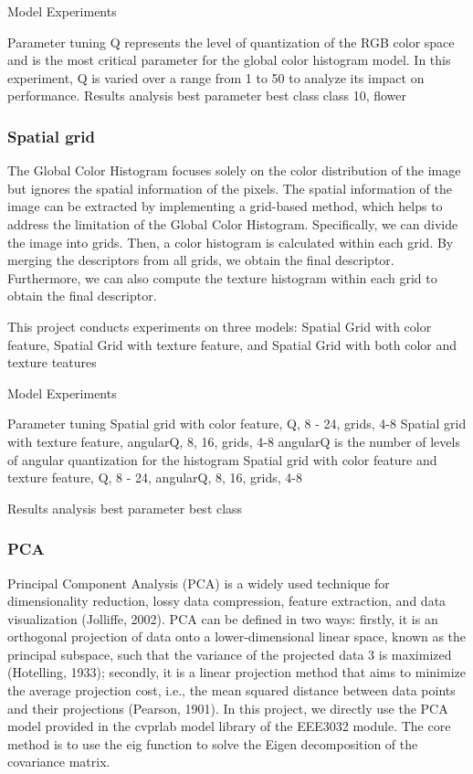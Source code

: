 \documentclass{article}
\begin{document}
Model Experiments

Parameter tuning
Q represents the level of quantization of the RGB color space and is the most critical parameter for the global color histogram model. In this experiment,  Q is varied over a range from 1 to 50 to analyze its impact on performance.
Results analysis
best parameter
best class   class 10, flower

\subsubsection{Spatial grid}

The Global Color Histogram focuses solely on the color distribution of the image but ignores the spatial information of the pixels. The spatial information of the image can be extracted by implementing a grid-based method, which helps to address the limitation of the Global Color Histogram. Specifically, we can divide the image into grids. Then, a color histogram is calculated within each grid. By merging the descriptors from all grids, we obtain the final descriptor. Furthermore, we can also compute the texture histogram within each grid to obtain the final descriptor.

This project conducts experiments on three models: Spatial Grid with color feature, Spatial Grid with texture feature, and Spatial Grid with both color and texture teatures



Model Experiments

Parameter tuning
Spatial grid with color feature,  Q, 8 - 24,  grids, 4-8
Spatial grid with texture feature, angularQ, 8, 16, grids, 4-8     angularQ is  the number of levels of angular quantization for the histogram
Spatial grid with color feature and texture feature,  Q, 8 - 24,  angularQ, 8, 16, grids, 4-8

Results analysis
best parameter
best class

\subsubsection{PCA}

Principal Component Analysis (PCA) is a widely used technique for dimensionality reduction, lossy data compression, feature extraction, and data visualization (Jolliffe, 2002).  PCA can be defined in two ways: firstly, it is an orthogonal projection of data onto a lower-dimensional linear space, known as the principal subspace, such that the variance of the projected data 3  is maximized (Hotelling, 1933); secondly, it is a linear projection method that aims to minimize the average projection cost, i.e., the mean squared distance between data points and their projections (Pearson, 1901). In this project, we directly use the PCA model provided in the cvprlab model library of the EEE3032 module. The core method is to use the eig function to solve the Eigen decomposition of the covariance matrix.
\end{document}
